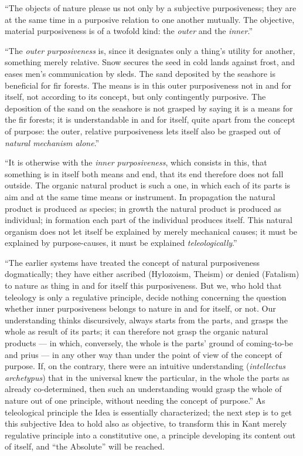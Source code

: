 \documentclass[12pt]{book}
\begin{document}
``The objects of nature please us not only by a subjective purposiveness; they are at the same time
in a purposive relation to one another mutually. The objective, material purposiveness is of a
twofold kind: the \emph{outer} and the \emph{inner}.''

``The \emph{outer purposiveness} is, since it designates only a thing's utility for another, something
merely relative. Snow secures the seed in cold lands against frost, and eases men's communication by
sleds. The sand deposited by the seashore is beneficial for fir forests. The means is in this outer
purposiveness not in and for itself, not
according to its concept, but only contingently purposive. The deposition of the sand on the seashore
is not grasped by saying it is a means for the fir forests; it is understandable in and for itself,
quite apart from the concept of purpose: the outer, relative purposiveness lets itself also be grasped
out of \emph{natural mechanism alone}.''

``It is otherwise with the \emph{inner purposiveness}, which consists in this, that something is in
itself both means and end, that its end therefore does not fall outside. The organic natural product
is such a one, in which each of its parts is aim and at the same time means or instrument. In
propagation the natural product is produced as species; in growth the natural product is produced as
individual; in formation each part of the individual produces itself. This natural organism does not
let itself be explained by merely mechanical causes; it must be explained by purpose-causes, it must
be explained \emph{teleologically}.''

``The earlier systems have treated the concept of natural purposiveness dogmatically; they have
either ascribed (Hylozoism, Theism) or denied (Fatalism) to nature as thing in and for itself this
purposiveness. But we, who hold that teleology is only a regulative principle, decide nothing
concerning the question whether inner purposiveness belongs to nature in and for itself, or not. Our
understanding thinks discursively, always starts from the parts, and grasps the whole as result of
its parts; it can therefore not grasp the organic natural products — in which, conversely, the whole
is the parts' ground of coming-to-be and prius — in any other way than under the point of view of the
concept of purpose. If, on the contrary, there were an intuitive understanding (\textit{intellectus
archetypus}) that in the universal knew the particular, in the whole the parts as already
co-determined, then such an understanding would grasp the whole of nature out of one principle,
without needing the concept of purpose.''
As teleological principle the Idea is essentially characterized; the next step is to get this
subjective Idea to hold also as objective, to transform this in Kant merely regulative principle into
a constitutive one, a principle developing its content out of itself, and ``the Absolute'' will be
reached.
\end{document}
